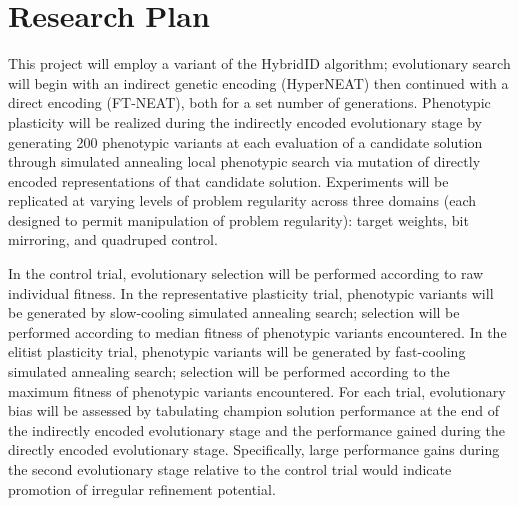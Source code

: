 \renewcommand{\thefootnote}{\fnsymbol{footnote}}
\section{Research Plan}
This project will employ a variant of the HybridID \autocite{Clune2011OnRegularity} algorithm;
evolutionary search will begin with an indirect genetic encoding (HyperNEAT) then continued with a direct encoding (FT-NEAT), both for a set number of generations.
Phenotypic plasticity will be realized during the indirectly encoded evolutionary stage by generating 200 phenotypic variants at each evaluation of a candidate solution through simulated annealing local phenotypic search via mutation of directly encoded representations of that candidate solution.
Experiments will be replicated at varying levels of problem regularity across three domains (each designed to permit manipulation of problem regularity): target weights, bit mirroring, and quadruped control.\autocite{Clune2011OnRegularity}

In the control trial, evolutionary selection will be performed according to raw individual fitness.
In the representative plasticity trial, phenotypic variants will be generated by slow-cooling simulated annealing search;
selection will be performed according to median fitness of phenotypic variants encountered.
In the elitist plasticity trial, phenotypic variants will be generated by fast-cooling simulated annealing search;
selection will be performed according to the maximum fitness of phenotypic variants encountered.
For each trial, evolutionary bias will be assessed by tabulating champion solution performance at the end of the indirectly encoded evolutionary stage and the performance gained during the directly encoded evolutionary stage.
Specifically, large performance gains during the second evolutionary stage relative to the control trial would indicate promotion of irregular refinement potential.
